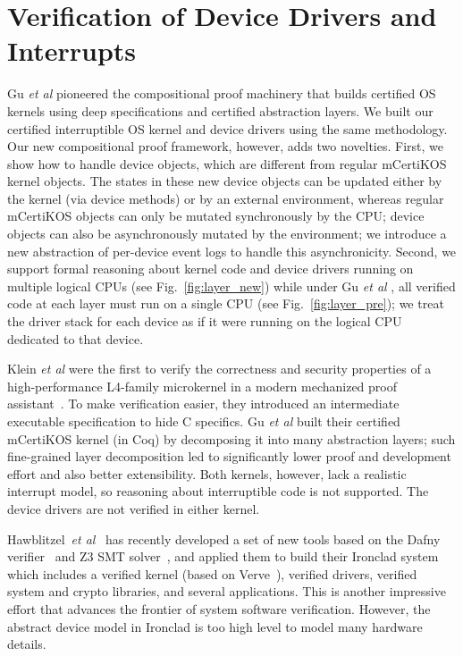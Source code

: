 \section{Verification of Device Drivers and Interrupts}

Gu {\em et al} \cite{dscal15} pioneered the compositional
proof machinery that
builds certified OS kernels using deep specifications and certified
abstraction layers. We built our certified interruptible OS kernel and
device drivers using the same methodology. Our new compositional proof
framework, however, adds two novelties.
First, we show how to handle
device objects, which are different from regular mCertiKOS kernel
objects. The states in these new device objects can be updated either
by the kernel (via device methods) or by an external environment,
whereas regular mCertiKOS objects can only be mutated synchronously by
the CPU; device objects can also be asynchronously mutated by the
environment; we introduce a new abstraction of per-device event logs
to handle this asynchronicity.
Second, we support formal reasoning about kernel code and device
drivers running on multiple logical CPUs (see
Fig.~\ref{fig:layer_new}) while under Gu {\em et al} \cite{dscal15}, all verified
code at each layer must run on a single CPU (see
Fig.~\ref{fig:layer_pre}); we treat the driver stack for each device
as if it were running on the logical CPU dedicated to that device.

Klein {\em et al} \cite{klein2009sel4} were the first to verify the correctness and
security properties of a high-performance L4-family microkernel in a
modern mechanized proof assistant~\cite{Paulson:Isabelle}.  To make
verification easier, they introduced an intermediate executable
specification to hide C specifics. Gu {\em et al} \cite{dscal15} built their
certified mCertiKOS kernel (in Coq) by decomposing it into many
abstraction layers; such fine-grained layer decomposition led to
significantly lower proof and development effort and also better
extensibility. Both kernels, however, lack a realistic
interrupt model, so reasoning about interruptible code is not
supported. The device drivers are not verified in either kernel.

Hawblitzel~{\em et al}~\cite{ironclad14} has recently developed a set
of new tools based on the Dafny verifier~\cite{dafny10} and Z3 SMT
solver~\cite{moura08}, and applied them to build their Ironclad system
which includes a verified kernel (based on Verve~\cite{hawblitzel10}),
verified drivers, verified system and crypto libraries, and several
applications.  This is another impressive effort that advances the
frontier of system software verification. However, the abstract device
model in Ironclad is too high level to model many hardware details.

